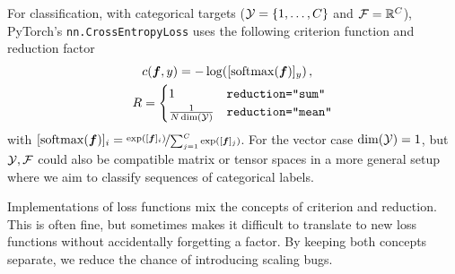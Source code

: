 \begin{example}\label{ex:cross_entropy_loss}
  For classification, with categorical targets (${\mathcal{Y}} = \{1, \dots, C\}$ and ${\mathcal{F}} = {\mathbb{R}}^C$), PyTorch's \texttt{nn.CrossEntropyLoss} uses the following criterion function and reduction factor
  \begin{align*}
    &c({\bm{f}}, y)
      =
      - \log([\mathrm{softmax}({\bm{f}})]_y)\,,
    \\
    R
    &=
      \begin{cases}
        1                     & \text{\texttt{reduction="sum"}}
        \\
        \frac{1}{N \dim({\mathcal{Y}})} & \text{\texttt{reduction="mean"}}
      \end{cases}
  \end{align*}
  with $[\mathrm{softmax}({\bm{f}})]_i = \nicefrac{\exp([{\bm{f}}]_i)}{\sum_{j=1}^C \exp([{\bm{f}}]_{j})}$.
  For the vector case $\dim({\mathcal{Y}}) = 1$, but ${\mathcal{Y}}, {\mathcal{F}}$ could also be compatible matrix or tensor spaces in a more general setup where we aim to classify sequences of categorical labels.
\end{example}
\switchcolumn[0]

\begin{caveat}
  Implementations of loss functions mix the concepts of criterion and reduction.
  This is often fine, but sometimes makes it difficult to translate to new loss functions without accidentally forgetting a factor.
  By keeping both concepts separate, we reduce the chance of introducing scaling bugs.
\end{caveat}

